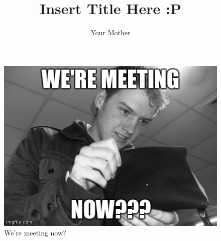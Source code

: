\documentclass[11pt]{report}
\begin{document}
\title{Insert Title Here :P} 
\author{Your Mother}
\maketitle
\thispagestyle{empty}
\newpage


\newpage

\newpage

\newpage


\begin{figure}[h]
\begin{center}
\includegraphics[scale=0.4]{./design/nathan} 
\end{center}
\caption{We're meeting now?}
\label{fig:we're meeting now?}
\end{figure} 
\end{document}
